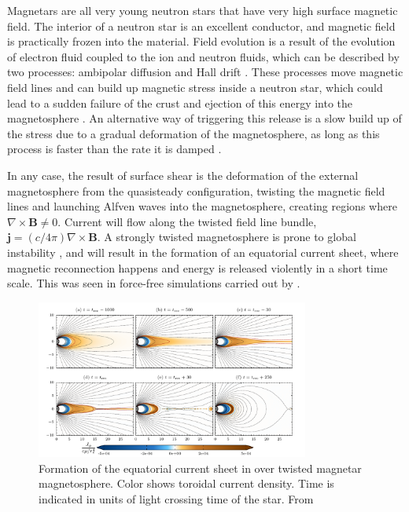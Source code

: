 Magnetars are all very young neutron stars that have very high surface magnetic
field. The interior of a neutron star is an excellent conductor, and magnetic
field is practically frozen into the material. Field evolution is a result of
the evolution of electron fluid coupled to the ion and neutron fluids, which can
be described by two processes: ambipolar diffusion and Hall drift
\citep{goldreich_magnetic_1992}. These processes move magnetic field lines and
can build up magnetic stress inside a neutron star, which could lead to a sudden
failure of the crust and ejection of this energy into the magnetosphere
\citep{thompson_soft_1995, thompson_giant_2001}. An alternative way of
triggering this release is a slow build up of the stress due to a gradual
deformation of the magnetosphere, as long as this process is faster than the
rate it is damped \citep{lyutikov_magnetar_2006}.

In any case, the result of surface shear is the deformation of the external
magnetosphere from the quasisteady configuration, twisting the magnetic field
lines and launching Alfven waves into the magnetosphere, creating regions where
$\nabla\times \mathbf{B} \neq 0$. Current will flow along the twisted field line
bundle, $\mathbf{j} = (c/4\pi)\nabla\times \mathbf{B}$. A strongly twisted
magnetosphere is prone to global instability \citep{uzdensky_shear-driven_2002},
and will result in the formation of an equatorial current sheet, where magnetic
reconnection happens and energy is released violently in a short time scale.
This was seen in force-free simulations carried out by
\citep{parfrey_dynamics_2013}.

\begin{figure}[h]
  \centering
  \includegraphics[width=0.8\textwidth]{pics/intro/ffe-giant-flare.png}
  \caption[Formation of the equatorial current sheet in over twisted magnetar
    magnetosphere.]{Formation of the equatorial current sheet in over twisted magnetar
    magnetosphere. Color shows toroidal current density. Time is indicated in
    units of light crossing time of the star. From \citep{parfrey_dynamics_2013}}
  \label{fig:overtwisted-magnetar}
\end{figure}

